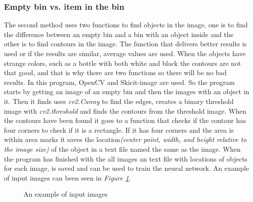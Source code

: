 \subsubsection*{Empty bin vs. item in the bin}\label{emptyvsitem}
The second method uses two functions to find objects in the image, one is to find the difference between an empty bin and a bin with an object inside and the other is to find contours in the image. 
The function that delivers better results is used or if the results are similar, average values are used. 
When the objects have strange colors, such as a bottle with both white and black the contours are not that good, and that is why there are two functions so there will be no bad results. 
In this program, OpenCV and Skicit-image are used. 
So the program starts by getting an image of an empty bin and then the images with an object in it. 
Then it finds uses \textit{cv2.Canny} to find the edges, creates a binary threshold image with \textit{cv2.threshold} and finds the contours from the threshold image.  
When the contours have been found it goes to a function that checks if the contour has four corners to check if it is a rectangle. 
If it has four corners and the area is within area marks it saves the location\textit{(center point, width, and height relative to the image size)} of the object in a text file named the same as the image. 
When the program has finished with the all images an text file with locations of objects for each image, is saved and can be used to train the neural network. An example of input images can been seen in \textit{Figure \ref{figure: emptyafter}}.
\begin{figure}[h]
    \centering
    \hfill
    \caption{An example of input images}
    \label{figure: emptyafter}
\end{figure}
\clearpage
